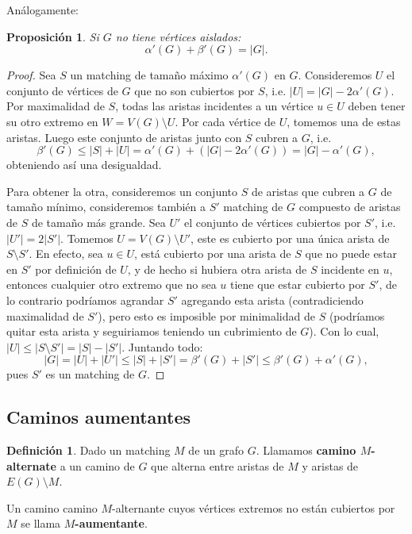\documentclass[12pt]{report}
\theoremstyle{plain}
\newtheorem{proposition}[theorem]{Proposición}
\theoremstyle{definition}
\newtheorem{definition}[theorem]{Definición}
\newcommand{\abs}[1]{\left \vert #1 \right \vert}
\begin{document}
Análogamente:
\begin{proposition}
Si $G$ no tiene vértices aislados:
\[
\boxed{\alpha ' (G) + \beta ' (G) = \abs G .}
\]
\end{proposition}
\begin{proof}
Sea $S$ un matching de tamaño máximo $\alpha ' (G)$ en $G$. Consideremos $U$ el conjunto de vértices de $G$ que no son cubiertos por $S$, i.e. $\abs U = \abs G - 2 \alpha ' (G)$. Por maximalidad de $S$, todas las aristas incidentes a un vértice $u \in U$ deben tener su otro extremo en $W = V(G) \setminus U$. Por cada vértice de $U$, tomemos una de estas aristas. Luego este conjunto de aristas junto con $S$ cubren a $G$, i.e.
\[
\beta ' (G) \leq \abs S + \abs U = \alpha ' (G) + (\abs G - 2 \alpha ' (G)) = \abs G - \alpha ' (G),
\]
obteniendo así una desigualdad.

Para obtener la otra, consideremos un conjunto $S$ de aristas que cubren a $G$ de tamaño mínimo, consideremos también a $S'$ matching de $G$ compuesto de aristas de $S$ de tamaño más grande. Sea $U'$ el conjunto de vértices cubiertos por $S'$, i.e. $\abs {U'} = 2 \abs {S'}$. Tomemos $U = V(G) \setminus U'$, este es cubierto por una única arista de $S \setminus S'$. En efecto, sea $u \in U$, está cubierto por una arista de $S$ que no puede estar en $S'$ por definición de $U$, y de hecho si hubiera otra arista de $S$ incidente en $u$, entonces cualquier otro extremo que no sea $u$ tiene que estar cubierto por $S'$, de lo contrario podríamos agrandar $S'$ agregando esta arista (contradiciendo maximalidad de $S'$), pero esto es imposible por minimalidad de $S$ (podríamos quitar esta arista y seguiriamos teniendo un cubrimiento de $G$). Con lo cual, $\abs {U} \leq \abs {S \setminus S'} = \abs S - \abs {S'}$. Juntando todo:
\[
\abs G = \abs U + \abs {U'} \leq \abs S + \abs {S'} = \beta ' (G) + \abs {S'} \leq \beta ' (G) + \alpha ' (G),
\]
pues $S'$ es un matching de $G$.
\end{proof}



\subsection{Caminos aumentantes}


\begin{definition}
Dado un matching $M$ de un grafo $G$. Llamamos \textbf{camino $M$-alternate} a un camino de $G$ que alterna entre aristas de $M$ y aristas de $E(G) \setminus M$.

Un camino camino $M$-alternante cuyos vértices extremos no están cubiertos por $M$ se llama \textbf{$M$-aumentante}.
\end{definition}
\end{document}
